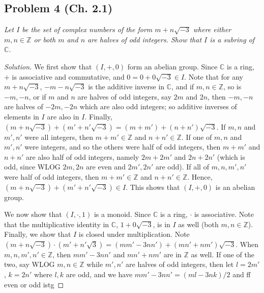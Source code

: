 \documentclass{article}
\newcommand{\Z}{{\mathbb Z}}
\newcommand{\C}{{\mathbb C}}
\begin{document}
\subsection*{Problem 4 (Ch. 2.1)}
{\it Let $I$ be the set of complex numbers of the form
$m + n\sqrt{-3}$ where either $m,n\in\Z$ or both
$m$ and $n$ are halves of odd integers.
Show that $I$ is a subring of $\C$.}
\begin{proof}[Solution]\let\qed\relax
	We first show that $(I,+,0)$ form an abelian group.
	Since $\C$ is a ring, $+$ is associative and commutative,
	and $0 = 0 + 0\sqrt{-3} \in I$.
	Note that for any $m + n\sqrt{-3}$, $-m - n\sqrt{-3}$ is the additive inverse in $\C$,
	and if $m,n \in \Z$, so is $-m,-n$,
	or if $m$ and $n$ are halves of odd integers, say $2m$ and $2n$,
	then $-m,-n$ are halves of $-2m,-2n$ which are also odd integers;
	so additive inverses of elements in $I$ are also in $I$.
	Finally, $(m + n\sqrt{-3}) + (m' + n'\sqrt{-3}) = (m + m') + (n + n')\sqrt{-3}$.
	If $m,n$ and $m',n'$ were all integers,
	then $m + m' \in \Z$ and $n + n' \in \Z$.
	If one of $m,n$ and $m',n'$ were integers,
	and so the others were half of odd integers,
	then $m + m'$ and $n + n'$ are also half of odd integers,
	namely $2m+2m'$ and $2n+2n'$
	(which is odd, since WLOG $2m,2n$ are even and $2m',2n'$ are odd).
	If all of $m,n,m',n'$ were half of odd integers,
	then $m + m' \in \Z$ and $n + n' \in \Z$.
	Hence, $(m + n\sqrt{-3}) + (m' + n'\sqrt{-3}) \in I$.
	This shows that $(I, + , 0)$ is an abelian group.

	We now show that $(I,\cdot,1)$ is a monoid.
	Since $\C$ is a ring, $\cdot$ is associative.
	Note that the multiplicative identity in $\C$,
	$1 + 0\sqrt{-3}$, is in $I$ as well (both $m,n \in \Z$).
	Finally, we show that $I$ is closed under multiplication.
	Note $(m + n\sqrt{-3})\cdot(m' + n'\sqrt{3})
	= (mm' - 3nn') + (mn' + nm')\sqrt{-3}$.
	When $m,n,m',n' \in \Z$, then $mm'-3nn'$ and $mn'+nm'$
	are in $\Z$ as well.
	If one of the two, say WLOG $m,n\in\Z$ while $m',n'$ are halves of odd integers,
	then let $l = 2m'$, $k = 2n'$ where $l,k$ are odd,
	and we have $mm' - 3nn' = (ml - 3nk)/2$ and ff even or odd istg


\end{proof}
\end{document}

